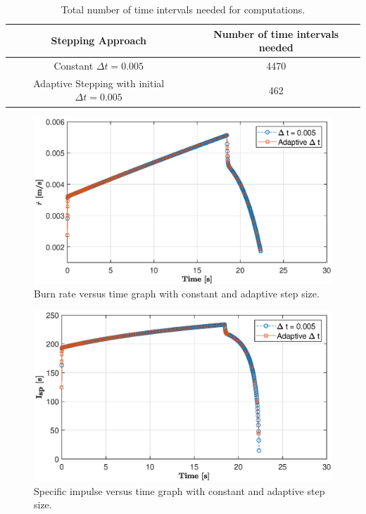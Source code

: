 \documentclass[letterpaper,12pt]{article}
\begin{document}
\begin{table}[!h]
	\begin{center}
	\caption{Total number of time intervals needed for computations.}
	\vspace{1em}
	\label{tbl:timeint}
	\begin{tabular}{|c|c|} 
	\hline
	\multicolumn{1}{|c|}{\bf{Stepping Approach}} & \multicolumn{1}{c|}{\bf{Number of time intervals needed}} \\
	\hline
	Constant $\Delta t = 0.005$ &   4470 \\ \hline
	Adaptive Stepping with initial $\Delta t = 0.005$ &   462 \\ \hline
	\end{tabular}
	\end{center}
\end{table}


\newpage

\begin{figure}[!h]
	\centering
	\includegraphics[height = 8.5 cm]{graphs/bonus_rdot.eps}
	\caption{Burn rate versus time graph with constant and adaptive step size.}
	\label{fig:bonus_rdot}
\end{figure}

\begin{figure}[!h]
	\centering
	\includegraphics[height = 8.5 cm]{graphs/bonus_isp.eps}
	\caption{Specific impulse versus time graph with constant and adaptive step size.}
	\label{fig:bonus_isp}
\end{figure}
\end{document}
